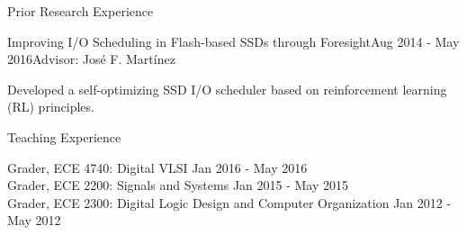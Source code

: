 \documentclass{resume} %
\begin{document}
\newpage


\begin{rSection}{Prior Research Experience}

\begin{rSubsection}{Improving I/O Scheduling in Flash-based SSDs through Foresight}{Aug 2014 - May 2016}{Advisor: José F. Martínez}

\item Developed a self-optimizing SSD I/O scheduler based on reinforcement learning (RL) principles. 
\end{rSubsection}

\end{rSection}


\begin{rSection}{Teaching Experience}

Grader, ECE 4740: Digital VLSI \hfill {Jan 2016 - May 2016} \\
Grader, ECE 2200: Signals and Systems \hfill {Jan 2015 - May 2015} \\
Grader, ECE 2300: Digital Logic Design and Computer Organization \hfill{Jan 2012 - May 2012}

\end{rSection}





\end{document}
